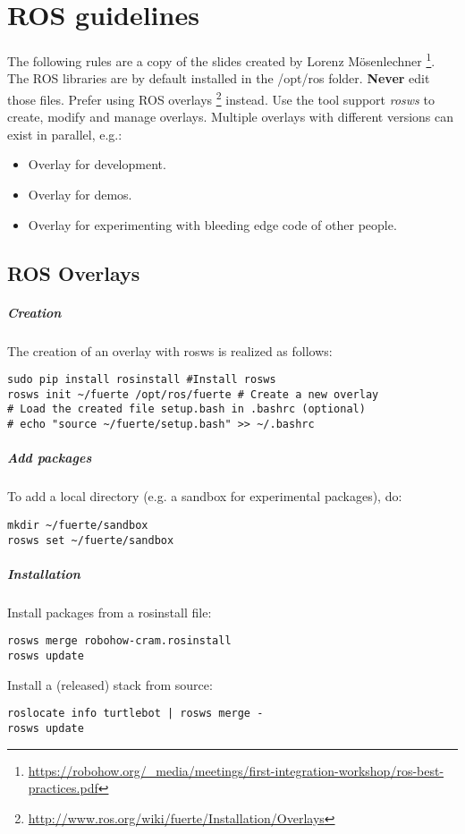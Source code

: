\chapter{ROS guidelines}

The following rules are a copy of the slides created by Lorenz M\"osenlechner \footnote{\url{https://robohow.org/_media/meetings/first-integration-workshop/ros-best-practices.pdf}}.\\

The ROS libraries are by default installed in the /opt/ros folder. 
\textbf{Never} edit those files. Prefer using ROS overlays \footnote{\url{http://www.ros.org/wiki/fuerte/Installation/Overlays}} instead.
Use the tool support \textit{rosws} to create, modify and manage overlays.
Multiple overlays with different versions can exist in parallel, e.g.:
\begin{itemize}
\item Overlay for development.
\item Overlay for demos.
\item Overlay for experimenting with bleeding edge code of other people.
\end{itemize}

\section{ROS Overlays}
\paragraph{Creation}
The creation of an overlay with rosws is realized as follows:
\begin{verbatim}
sudo pip install rosinstall #Install rosws
rosws init ~/fuerte /opt/ros/fuerte # Create a new overlay
# Load the created file setup.bash in .bashrc (optional)
# echo "source ~/fuerte/setup.bash" >> ~/.bashrc 
\end{verbatim}

\paragraph{Add packages}
To add a local directory (e.g. a sandbox for experimental packages), do:
\begin{verbatim}
mkdir ~/fuerte/sandbox
rosws set ~/fuerte/sandbox
\end{verbatim}

\paragraph{Installation}
Install packages from a rosinstall file:
\begin{verbatim}
rosws merge robohow-cram.rosinstall
rosws update
\end{verbatim}
Install a (released) stack from source:
\begin{verbatim}
roslocate info turtlebot | rosws merge -
rosws update
\end{verbatim}

